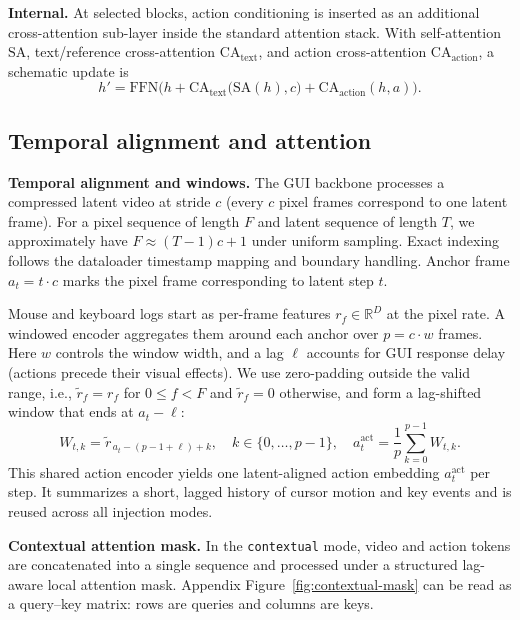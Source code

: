\textbf{Internal.} At selected blocks, action conditioning is inserted as an additional cross-attention sub-layer inside the standard attention stack.
With self-attention $\mathrm{SA}$, text/reference cross-attention $\mathrm{CA}_{\text{text}}$, and action cross-attention $\mathrm{CA}_{\text{action}}$, a schematic update is
\[
  h' = \mathrm{FFN}\Big(
    h + \mathrm{CA}_{\text{text}}\big(\mathrm{SA}(h), c\big)
      + \mathrm{CA}_{\text{action}}(h, a)
  \Big).
\]

\subsection{Temporal alignment and attention}
\noindent\textbf{Temporal alignment and windows.}
The GUI backbone processes a compressed latent video at stride $c$ (every $c$ pixel frames correspond to one latent frame).
For a pixel sequence of length $F$ and latent sequence of length $T$, we approximately have $F \approx (T-1)c + 1$ under uniform sampling.
Exact indexing follows the dataloader timestamp mapping and boundary handling.
Anchor frame $a_t = t \cdot c$ marks the pixel frame corresponding to latent step $t$.

Mouse and keyboard logs start as per-frame features $r_f \in \mathbb{R}^D$ at the pixel rate.
A windowed encoder aggregates them around each anchor over $p = c \cdot w$ frames.
Here $w$ controls the window width, and a lag $\ell$ accounts for GUI response delay (actions precede their visual effects).
We use zero-padding outside the valid range, i.e., $\tilde{r}_f=r_f$ for $0\le f<F$ and $\tilde{r}_f=0$ otherwise, and form a lag-shifted window that ends at $a_t-\ell$:
\[
  W_{t,k} = \tilde{r}_{\,a_t - (p-1+\ell) + k}, \quad k\in\{0,\dots,p-1\}, \quad
  a^{\text{act}}_t = \frac{1}{p} \sum_{k=0}^{p-1} W_{t,k}.
\]
This shared action encoder yields one latent-aligned action embedding $a^{\text{act}}_t$ per step.
It summarizes a short, lagged history of cursor motion and key events and is reused across all injection modes.

\noindent\textbf{Contextual attention mask.}
In the \texttt{contextual} mode, video and action tokens are concatenated into a single sequence and processed under a structured lag-aware local attention mask.
Appendix Figure~\ref{fig:contextual-mask} can be read as a query--key matrix: rows are queries and columns are keys.

